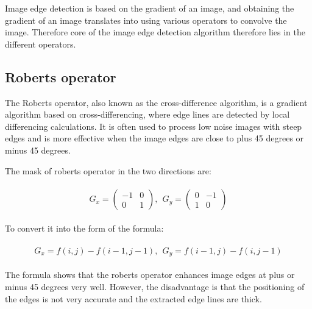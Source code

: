 \documentclass[hyperref]{article}
\theoremstyle{nonumberplain}
\begin{document}
	Image edge detection is based on the gradient of an image, and obtaining the gradient of an image translates into using various operators to convolve the image. Therefore core of the image edge detection algorithm therefore lies in the different operators. 
	
	
	
	\subsection{Roberts operator}
	
	\hspace{1.0em}
	The Roberts operator, also known as the cross-difference algorithm, is a gradient algorithm based on cross-differencing, where edge lines are detected by local differencing calculations. It is often used to process low noise images with steep edges and is more effective when the image edges are close to plus 45 degrees or minus 45 degrees.
	
	The mask of roberts operator in the two directions are:
	
	\begin{equation}
	\begin{split}
	\begin{aligned}
	G_{x}=\begin{pmatrix}
	-1 &0 \\ 
	0 &1 
	\end{pmatrix}, \ \ G_{y}=\begin{pmatrix}
	0 &-1 \\ 
	1 &0 
	\end{pmatrix}
	\end{aligned}
	\end{split}
	\label{eq14}
	\end{equation}
	
	To convert it into the form of the formula:
	
	\begin{equation}
	\begin{split}
	\begin{aligned}
	G_{x}=f(i,j)-f(i-1,j-1), \ \ G_{y}=f(i-1,j)-f(i,j-1)
	\end{aligned}
	\end{split}
	\label{eq15}
	\end{equation}
	
	The formula shows that the roberts operator enhances image edges at plus or minus 45 degrees very well. However, the disadvantage is that the positioning of the edges is not very accurate and the extracted edge lines are thick.
	
\end{document}
